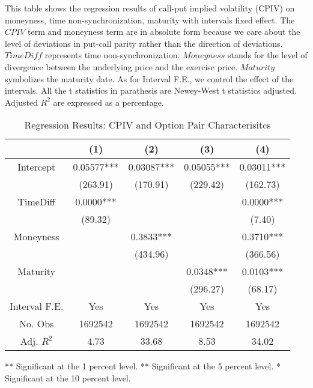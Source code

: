 \begin{table}[h]

\caption{Regression Results: CPIV and Option Pair Characterisitcs}\label{table:regression1}
\begin{threeparttable}

\medskip

{\footnotesize 
This table shows the regression results of call-put implied volatility (CPIV) on moneyness, time non-synchronization, maturity with intervals fixed effect. The $CPIV$ term and moneyness term are in absolute form because we care about the level of deviations in put-call parity rather than the direction of deviations. $TimeDiff$ represents time non-synchronization. $Moneyness$ stands for the level of divergence between the underlying price and the exercise price. $Maturity$ symbolizes the maturity date. As for Interval F.E., we control the effect of the intervals. All the t statistics in parathesis are Newey-West t statistics adjusted. Adjusted $R^{2}$ are expressed as a percentage.
}
\medskip
\bigskip
\large

\centering
\begin{tabular*}{\textwidth}{@{\extracolsep{\fill}} ccccc}
\toprule
              & (1)        &    (2)        & (3)        & (4)        \\ \midrule
Intercept     & 0.05577*** &    0.03087*** & 0.05055*** & 0.03011*** \\
              & (263.91)   &    (170.91)   & (229.42)   & (162.73)   \\
TimeDiff      & 0.0000***  &               &            & 0.0000***  \\
              & (89.32)    &               &            & (7.40)     \\
Moneyness     &            &    0.3833***  &            & 0.3710***  \\
              &            &   (434.96)    &            & (366.56)   \\
Maturity      &            &               & 0.0348***  & 0.0103***  \\
              &            &               & (296.27)   & (68.17)    \\
Interval F.E. & Yes        &   Yes         & Yes        & Yes        \\
No. Obs       & 1692542    &   1692542     & 1692542    & 1692542    \\
Adj. $R^{2}$  & 4.73       &   33.68       & 8.53       & 34.02     \\
\bottomrule
\end{tabular*}

\begin{tablenotes}
\small
\item *** Significant at the 1 percent level.    
** Significant at the 5 percent level.   
* Significant at the 10 percent level.
\end{tablenotes}


\end{threeparttable}

\end{table}


